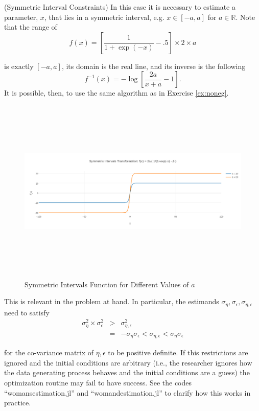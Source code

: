 \begin{example} (Symmetric Interval Constraints)
In this case it is necessary to estimate a parameter, $x$, that lies in a symmetric interval, e.g. $x \in [-a,a]$ for  $a \in \mathbb{R}$. Note that the range of
\begin{equation}
f(x) = \left[ \frac{1}{1+ \exp(-x)} -.5 \right] \times 2 \times a
\end{equation}

\noindent is exactly $[-a,a]$, its domain is the real line, and its inverse is the following 
\begin{equation}
f^{-1}(x) = - \log \left[ \frac{2a}{x+a} - 1 \right].
\end{equation}
\noindent It is possible, then, to use the same algorithm as in Exercise \ref{ex:noneg}.
\end{example}

\begin{center}
\begin{figure}[H]
\caption{Symmetric Intervals Function for Different Values of $a$}
\centering
\includegraphics[width=4.5in, height=3.5in]{symmetric_intervals.png}
\end{figure}
\end{center}

\indent This is relevant in the problem at hand. In particular, the estimands $\sigma_{\eta},\sigma_{\epsilon},\sigma_{\eta,\epsilon}$ need to satisfy
\begin{eqnarray}
\sigma_{\eta}^2 \times \sigma_{\epsilon}^2 &>& \sigma_{\eta,\epsilon}^2 \nonumber \\
&=& -\sigma_{\eta} \sigma_{\epsilon} < \sigma_{\eta,\epsilon} < \sigma_{\eta} \sigma_{\epsilon}
\end{eqnarray}

\noindent for the co-variance matrix of $\eta,\epsilon$ to be positive definite. If this restrictions are ignored and the initial conditions are arbitrary (i.e., the researcher ignores how the data generating process behaves and the initial conditions are a guess) the optimization routine may fail to have success. See the codes ``womansestimation.jl'' and ``womandestimation.jl'' to clarify how this works in practice.

